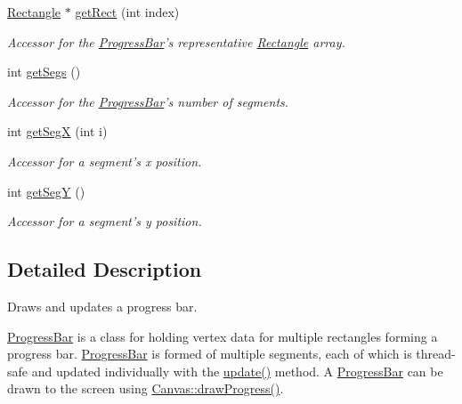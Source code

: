 \begin{DoxyCompactItemize}
\hyperlink{classtsgl_1_1_rectangle}{\-Rectangle} $\ast$ \hyperlink{classtsgl_1_1_progress_bar_aa360099f70e0c33c99f349cf28cbe610}{get\-Rect} (int index)
\begin{DoxyCompactList}\small\item\em \-Accessor for the \hyperlink{classtsgl_1_1_progress_bar}{\-Progress\-Bar}'s representative \hyperlink{classtsgl_1_1_rectangle}{\-Rectangle} array. \end{DoxyCompactList}\item 
int \hyperlink{classtsgl_1_1_progress_bar_a25576903783f18f8d74570aed2f80d95}{get\-Segs} ()
\begin{DoxyCompactList}\small\item\em \-Accessor for the \hyperlink{classtsgl_1_1_progress_bar}{\-Progress\-Bar}'s number of segments. \end{DoxyCompactList}\item 
int \hyperlink{classtsgl_1_1_progress_bar_a7ecdc35e44496db7cf2e25b2ee6577d4}{get\-Seg\-X} (int i)
\begin{DoxyCompactList}\small\item\em \-Accessor for a segment's x position. \end{DoxyCompactList}\item 
int \hyperlink{classtsgl_1_1_progress_bar_a7efb6be08196ad2b48d4417a93d750ad}{get\-Seg\-Y} ()
\begin{DoxyCompactList}\small\item\em \-Accessor for a segment's y position. \end{DoxyCompactList}\end{DoxyCompactItemize}


\subsection{\-Detailed \-Description}
\-Draws and updates a progress bar. 

\hyperlink{classtsgl_1_1_progress_bar}{\-Progress\-Bar} is a class for holding vertex data for multiple rectangles forming a progress bar. \hyperlink{classtsgl_1_1_progress_bar}{\-Progress\-Bar} is formed of multiple segments, each of which is thread-\/safe and updated individually with the \hyperlink{classtsgl_1_1_progress_bar_a4274998e4935f33eb9212b2174d9c0c5}{update()} method. \-A \hyperlink{classtsgl_1_1_progress_bar}{\-Progress\-Bar} can be drawn to the screen using \hyperlink{classtsgl_1_1_canvas_aea792059486ebe6d25d7f81bdadf751d}{\-Canvas\-::draw\-Progress()}. 

